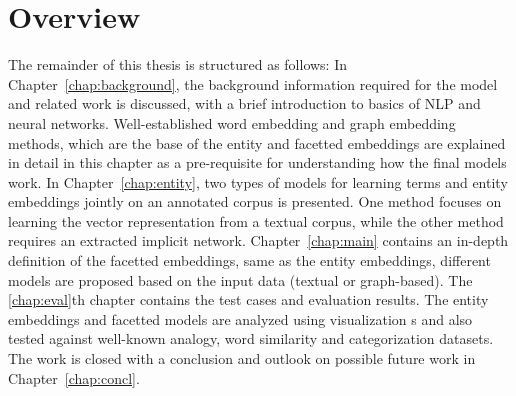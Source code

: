 \section{Overview}
The remainder of this thesis is structured as follows: In Chapter~\ref{chap:background}, the background information required for the model and related work is discussed, with a brief introduction to basics of NLP and neural networks. Well-established word embedding and graph embedding methods, which are the base of the entity and facetted embeddings are explained in detail in this chapter as a pre-requisite for understanding how the final models work. In Chapter~\ref{chap:entity}, two types of models for learning terms and entity embeddings jointly on an annotated corpus is presented. One method focuses on learning the vector representation from a textual corpus, while the other method requires an extracted implicit network. Chapter~\ref{chap:main} contains an in-depth definition of the facetted embeddings, same as the entity embeddings, different models are proposed based on the input data (textual or graph-based). The \ref{chap:eval}th chapter contains the test cases and evaluation results. The entity embeddings and facetted models are analyzed using visualization s and also tested against well-known analogy, word similarity and categorization datasets. The work is closed with a conclusion and outlook on possible future work in Chapter~\ref{chap:concl}. 




%
